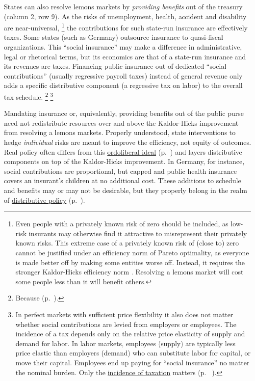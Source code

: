 States can also resolve lemons markets by \emph{providing benefits} out of the treasury (column 2, row 9).
As the risks of unemployment, health, accident and disability are near-universal,
\footnote{
	Even people with a privately known risk of zero should be included, as low-risk insurants may otherwise find it attractive to misrepresent their privately known risks.
	This extreme case of a privately known risk of (close to) zero cannot be justified under an efficiency norm of Pareto optimality, as everyone is made better off by making some entities worse off.
	Instead, it requires the stronger Kaldor-Hicks efficiency norm \citep{Kaldor1939,Hicks1939}.
	Resolving a lemons market will cost some people less than it will benefit others.
}
the contributions for such state-run insurance are effectively taxes. Some states (such as Germany) outsource insurance to quasi-fiscal organizations.
This ``social insurance'' may make a difference in administrative, legal or rhetorical terms, but its economics are that of a state-run insurance and its revenues are taxes.
Financing public insurance out of dedicated ``social contributions'' (usually regressive payroll taxes) instead of general revenue only adds a specific distributive component (a regressive tax on labor) to the overall tax schedule.
\footnote{
	Because  (p.~\pageref{sec:redistribution-and-revenue-are-one}).
}
\footnote{
	In perfect markets with sufficient price flexibility it also does not matter whether social contributions are levied from employers or employees. The incidence of a tax depends only on the relative price elasticity of supply and demand for labor. In labor markets, employees (supply) are typically less price elastic than employers (demand) who can substitute labor for capital, or move their capital. Employees end up paying for ``social insurance'' no matter the nominal burden. Only the \hyperref[sec:well-determined-incidence]{incidence of taxation} matters (p.~ \pageref{sec:well-determinedincidence}).
}

Mandating insurance or, equivalently, providing benefits out of the public purse need not redistribute resources over and above the Kaldor-Hicks improvement from resolving a lemons markets.
Properly understood, state interventions to hedge \emph{individual} risks are meant to improve the efficiency, not equity of outcomes.
Real policy often differs from this \hyperref[sec:ordoliberalhygiene]{ordoliberal ideal} (p.~\pageref{sec:ordoliberalhygiene}) and layers distributive components on top of the Kaldor-Hicks improvement.
In Germany, for instance, social contributions are proportional, but capped and public health insurance covers an insurant's children at no additional cost.
These additions to schedule and benefits may or may not be desirable, but they properly belong in the realm of \hyperref[sec:distribution]{distributive policy} (p.~\pageref{sec:distribution}).

